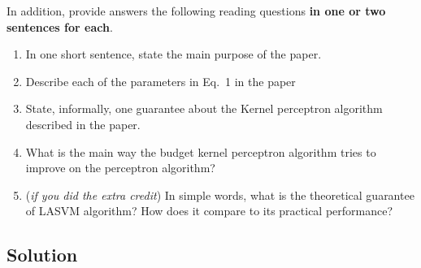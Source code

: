 \documentclass[submit]{harvardml}
\begin{document}
\begin{problem}
In addition, provide answers the following reading questions
{\bf in one or two sentences for each}.
%
\begin{enumerate}
\item In one short sentence, state the main purpose of the paper.
\item Describe each of the parameters in Eq.~1 in the paper
\item State, informally, one guarantee about the Kernel perceptron algorithm described in the
  paper. 
\item What is the main way the budget kernel perceptron algorithm tries to
  improve on the perceptron algorithm?
\item ({\em if you did the extra credit}) In simple words, what is the theoretical guarantee of LASVM algorithm? How
  does it compare to its practical performance?
\end{enumerate}


\end{problem}

\subsection*{Solution}
\end{document}
